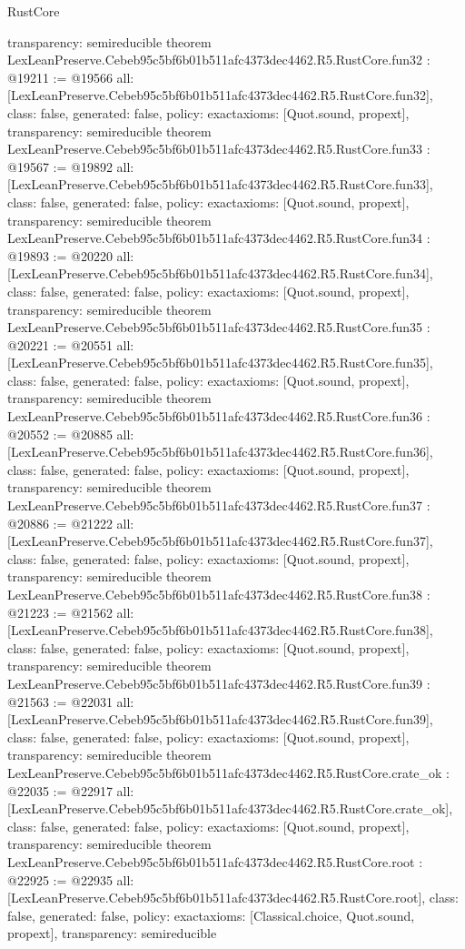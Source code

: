 \begin{lexlean}{RustCore}
\begin{coremodule}
{  transparency: semireducible
}
theorem LexLeanPreserve.Cebeb95c5bf6b01b511afc4373dec4462.R5.RustCore.fun32 : @19211 := @19566 {
  all: [LexLeanPreserve.Cebeb95c5bf6b01b511afc4373dec4462.R5.RustCore.fun32],
  class: false,
  generated: false,
  policy: exact{axioms: [Quot.sound, propext]},
  transparency: semireducible
}
theorem LexLeanPreserve.Cebeb95c5bf6b01b511afc4373dec4462.R5.RustCore.fun33 : @19567 := @19892 {
  all: [LexLeanPreserve.Cebeb95c5bf6b01b511afc4373dec4462.R5.RustCore.fun33],
  class: false,
  generated: false,
  policy: exact{axioms: [Quot.sound, propext]},
  transparency: semireducible
}
theorem LexLeanPreserve.Cebeb95c5bf6b01b511afc4373dec4462.R5.RustCore.fun34 : @19893 := @20220 {
  all: [LexLeanPreserve.Cebeb95c5bf6b01b511afc4373dec4462.R5.RustCore.fun34],
  class: false,
  generated: false,
  policy: exact{axioms: [Quot.sound, propext]},
  transparency: semireducible
}
theorem LexLeanPreserve.Cebeb95c5bf6b01b511afc4373dec4462.R5.RustCore.fun35 : @20221 := @20551 {
  all: [LexLeanPreserve.Cebeb95c5bf6b01b511afc4373dec4462.R5.RustCore.fun35],
  class: false,
  generated: false,
  policy: exact{axioms: [Quot.sound, propext]},
  transparency: semireducible
}
theorem LexLeanPreserve.Cebeb95c5bf6b01b511afc4373dec4462.R5.RustCore.fun36 : @20552 := @20885 {
  all: [LexLeanPreserve.Cebeb95c5bf6b01b511afc4373dec4462.R5.RustCore.fun36],
  class: false,
  generated: false,
  policy: exact{axioms: [Quot.sound, propext]},
  transparency: semireducible
}
theorem LexLeanPreserve.Cebeb95c5bf6b01b511afc4373dec4462.R5.RustCore.fun37 : @20886 := @21222 {
  all: [LexLeanPreserve.Cebeb95c5bf6b01b511afc4373dec4462.R5.RustCore.fun37],
  class: false,
  generated: false,
  policy: exact{axioms: [Quot.sound, propext]},
  transparency: semireducible
}
theorem LexLeanPreserve.Cebeb95c5bf6b01b511afc4373dec4462.R5.RustCore.fun38 : @21223 := @21562 {
  all: [LexLeanPreserve.Cebeb95c5bf6b01b511afc4373dec4462.R5.RustCore.fun38],
  class: false,
  generated: false,
  policy: exact{axioms: [Quot.sound, propext]},
  transparency: semireducible
}
theorem LexLeanPreserve.Cebeb95c5bf6b01b511afc4373dec4462.R5.RustCore.fun39 : @21563 := @22031 {
  all: [LexLeanPreserve.Cebeb95c5bf6b01b511afc4373dec4462.R5.RustCore.fun39],
  class: false,
  generated: false,
  policy: exact{axioms: [Quot.sound, propext]},
  transparency: semireducible
}
theorem LexLeanPreserve.Cebeb95c5bf6b01b511afc4373dec4462.R5.RustCore.crate_ok : @22035 := @22917 {
  all: [LexLeanPreserve.Cebeb95c5bf6b01b511afc4373dec4462.R5.RustCore.crate_ok],
  class: false,
  generated: false,
  policy: exact{axioms: [Quot.sound, propext]},
  transparency: semireducible
}
theorem LexLeanPreserve.Cebeb95c5bf6b01b511afc4373dec4462.R5.RustCore.root : @22925 := @22935 {
  all: [LexLeanPreserve.Cebeb95c5bf6b01b511afc4373dec4462.R5.RustCore.root],
  class: false,
  generated: false,
  policy: exact{axioms: [Classical.choice, Quot.sound, propext]},
  transparency: semireducible
}


\end{coremodule}
\end{lexlean}
